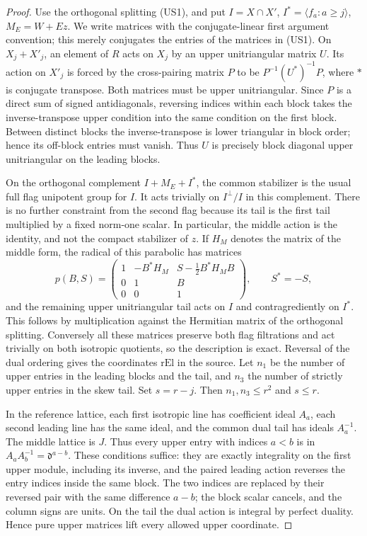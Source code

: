 \begin{proof}
Use the orthogonal splitting (US1), and put \(I=X\cap X'\),
\(I^*=\langle f_a:a\ge j\rangle\), \(M_E=W+Ez\).
We write matrices with the conjugate-linear first argument
convention; this merely conjugates the entries of the matrices
in (US1). On \(X_j+X'_j\), an element of \(R\) acts on
\(X_j\) by an upper unitriangular matrix \(U\).
Its action on \(X'_j\) is forced by the cross-pairing matrix
\(P\) to be \(P^{-1}(U^*)^{-1}P\), where \(*\) is conjugate
transpose. Both matrices must be upper unitriangular.
Since \(P\) is a direct sum of signed antidiagonals, reversing
indices within each block takes the inverse-transpose upper
condition into the same condition on the first block. Between
distinct blocks the inverse-transpose is lower triangular in
block order; hence its off-block entries must vanish.
Thus \(U\) is precisely block diagonal upper unitriangular
on the leading blocks.

On the orthogonal complement \(I+M_E+I^*\), the common
stabilizer is the usual full flag unipotent group for \(I\).
It acts trivially on \(I^\perp/I\) in this complement.
There is no further constraint from the second flag because its
tail is the first tail multiplied by a fixed norm-one scalar.
In particular, the middle action is the identity, and not
the compact stabilizer of \(z\). If \(H_M\) denotes the matrix of
the middle form, the radical of this parabolic has matrices
\[
 p(B,S)=
 \begin{pmatrix}
 1&-B^*H_M&S-\tfrac12 B^*H_MB\\
 0&1&B\\0&0&1
 \end{pmatrix},
 \qquad S^*=-S,
\]
and the remaining upper unitriangular tail acts on \(I\) and
contragrediently on \(I^*\). This follows by multiplication
against the Hermitian matrix of the orthogonal splitting.
Conversely all these matrices preserve both flag filtrations
and act trivially on both isotropic quotients, so the description
is exact. Reversal of the dual ordering gives the coordinates
\(\mathrm{rEl}\) in the source. Let \(n_1\) be the number of upper
entries in the leading blocks and the tail, and \(n_3\) the number
of strictly upper entries in the skew tail. Set \(s=r-j\).
Then \(n_1,n_3\le r^2\) and \(s\le r\).

In the reference lattice, each first isotropic line has
coefficient ideal \(A_a\), each second leading line has the
same ideal, and the common dual tail has ideals \(A_a^{-1}\).
The middle lattice is \(J\). Thus every upper entry with
indices \(a<b\) is in \(A_a A_b^{-1}=\mathfrak d^{a-b}\).
These conditions suffice: they are exactly integrality on the
first upper module, including its inverse, and the paired
leading action reverses the entry indices inside the same
block. The two indices are replaced by their reversed pair
with the same difference \(a-b\); the block scalar cancels,
and the column signs are units. On the tail the dual action
is integral by perfect duality. Hence pure upper matrices
lift every allowed upper coordinate.


\end{proof}

